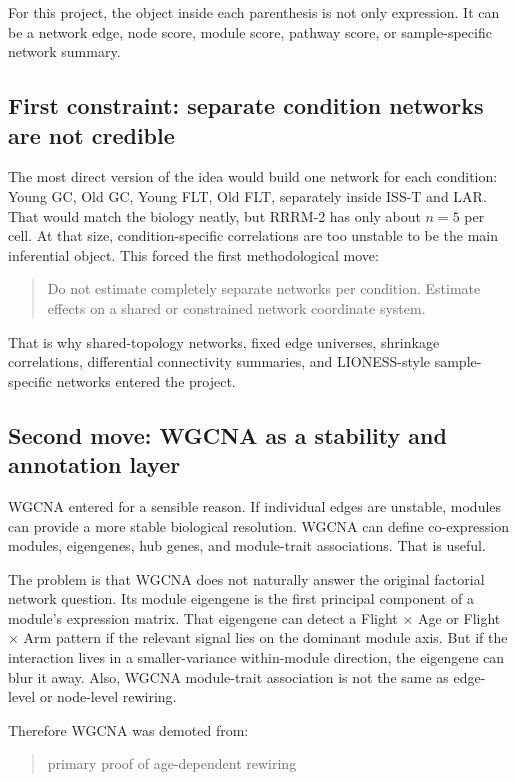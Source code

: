 \documentclass[11pt]{article}
\begin{document}
For this project, the object inside each parenthesis is not only expression. It
can be a network edge, node score, module score, pathway score, or
sample-specific network summary.

\subsection{First constraint: separate condition networks are not credible}

The most direct version of the idea would build one network for each condition:
Young GC, Old GC, Young FLT, Old FLT, separately inside ISS-T and LAR. That would
match the biology neatly, but RRRM-2 has only about $n=5$ per cell. At that size,
condition-specific correlations are too unstable to be the main inferential
object. This forced the first methodological move:

\begin{quote}
Do not estimate completely separate networks per condition. Estimate effects on
a shared or constrained network coordinate system.
\end{quote}

That is why shared-topology networks, fixed edge universes, shrinkage
correlations, differential connectivity summaries, and LIONESS-style
sample-specific networks entered the project.

\subsection{Second move: WGCNA as a stability and annotation layer}

WGCNA entered for a sensible reason. If individual edges are unstable, modules
can provide a more stable biological resolution. WGCNA can define co-expression
modules, eigengenes, hub genes, and module-trait associations. That is useful.

The problem is that WGCNA does not naturally answer the original factorial
network question. Its module eigengene is the first principal component of a
module's expression matrix. That eigengene can detect a Flight $\times$ Age or
Flight $\times$ Arm pattern if the relevant signal lies on the dominant module
axis. But if the interaction lives in a smaller-variance within-module direction,
the eigengene can blur it away. Also, WGCNA module-trait association is not the
same as edge-level or node-level rewiring.

Therefore WGCNA was demoted from:

\begin{quote}
primary proof of age-dependent rewiring
\end{quote}
\end{document}
